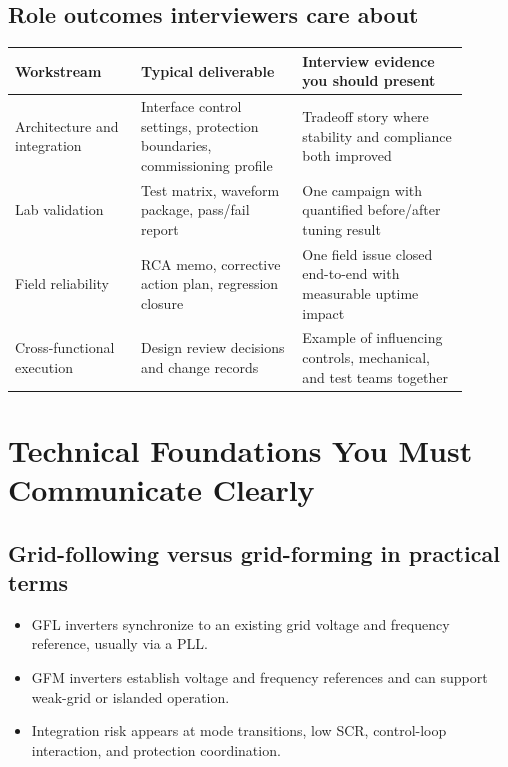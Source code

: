 \documentclass[11pt]{article}
\begin{document}
\subsection{Role outcomes interviewers care about}
\begin{table}[h]
\centering
\begin{tabular}{p{0.25\linewidth}p{0.32\linewidth}p{0.33\linewidth}}
\toprule
Workstream & Typical deliverable & Interview evidence you should present \\
\midrule
Architecture and integration & Interface control settings, protection boundaries, commissioning profile & Tradeoff story where stability and compliance both improved \\
Lab validation & Test matrix, waveform package, pass/fail report & One campaign with quantified before/after tuning result \\
Field reliability & RCA memo, corrective action plan, regression closure & One field issue closed end-to-end with measurable uptime impact \\
Cross-functional execution & Design review decisions and change records & Example of influencing controls, mechanical, and test teams together \\
\bottomrule
\end{tabular}
\end{table}

\section{Technical Foundations You Must Communicate Clearly}

\subsection{Grid-following versus grid-forming in practical terms}
\begin{itemize}
  \item GFL inverters synchronize to an existing grid voltage and frequency reference, usually via a PLL.
  \item GFM inverters establish voltage and frequency references and can support weak-grid or islanded operation.
  \item Integration risk appears at mode transitions, low SCR, control-loop interaction, and protection coordination.
\end{itemize}
\end{document}
